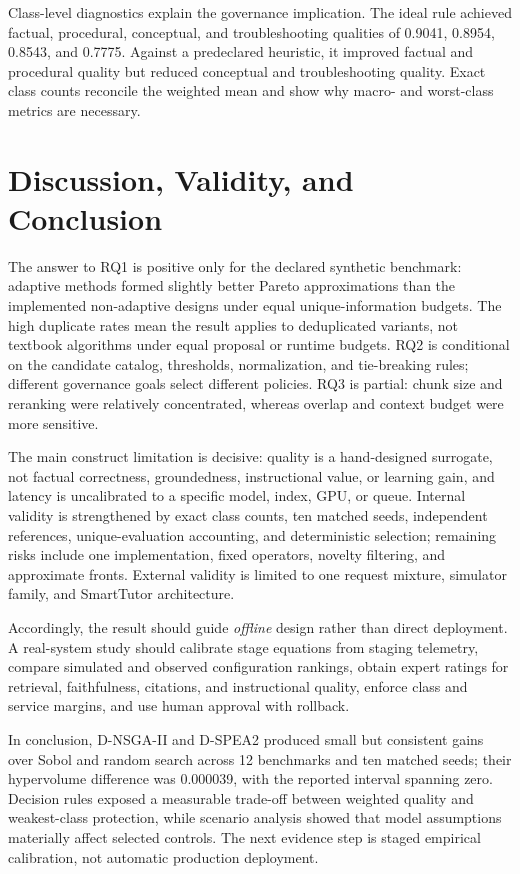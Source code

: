 \documentclass[runningheads]{llncs}
\begin{document}
Class-level diagnostics explain the governance implication. The ideal rule achieved factual, procedural, conceptual, and troubleshooting qualities of 0.9041, 0.8954, 0.8543, and 0.7775. Against a predeclared heuristic, it improved factual and procedural quality but reduced conceptual and troubleshooting quality. Exact class counts reconcile the weighted mean and show why macro- and worst-class metrics are necessary.

\section{Discussion, Validity, and Conclusion}

The answer to RQ1 is positive only for the declared synthetic benchmark: adaptive methods formed slightly better Pareto approximations than the implemented non-adaptive designs under equal unique-information budgets. The high duplicate rates mean the result applies to deduplicated variants, not textbook algorithms under equal proposal or runtime budgets. RQ2 is conditional on the candidate catalog, thresholds, normalization, and tie-breaking rules; different governance goals select different policies. RQ3 is partial: chunk size and reranking were relatively concentrated, whereas overlap and context budget were more sensitive.

The main construct limitation is decisive: quality is a hand-designed surrogate, not factual correctness, groundedness, instructional value, or learning gain, and latency is uncalibrated to a specific model, index, GPU, or queue. Internal validity is strengthened by exact class counts, ten matched seeds, independent references, unique-evaluation accounting, and deterministic selection; remaining risks include one implementation, fixed operators, novelty filtering, and approximate fronts. External validity is limited to one request mixture, simulator family, and SmartTutor architecture.

Accordingly, the result should guide \emph{offline} design rather than direct deployment. A real-system study should calibrate stage equations from staging telemetry, compare simulated and observed configuration rankings, obtain expert ratings for retrieval, faithfulness, citations, and instructional quality, enforce class and service margins, and use human approval with rollback.

In conclusion, D-NSGA-II and D-SPEA2 produced small but consistent gains over Sobol and random search across 12 benchmarks and ten matched seeds; their hypervolume difference was 0.000039, with the reported interval spanning zero. Decision rules exposed a measurable trade-off between weighted quality and weakest-class protection, while scenario analysis showed that model assumptions materially affect selected controls. The next evidence step is staged empirical calibration, not automatic production deployment.
\end{document}
